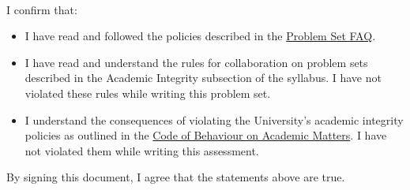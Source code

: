 {{\begin{minipage}{\textwidth}
{	\vspace{0.1in}
	
}
\end{minipage}
}

\vspace*{0.1in}

~

I confirm that:

\begin{itemize} 
	\item I have read and followed the policies described in the \href{\urlFAQ}{Problem Set FAQ}. 
	\item I have read and understand the rules for collaboration on problem sets described in the Academic Integrity subsection of the syllabus. I have not violated these rules while writing this problem set. 
	\item I understand the consequences of violating the University's academic integrity policies as outlined in the \href{http://www.governingcouncil.utoronto.ca/policies/behaveac.htm}{Code of Behaviour on Academic Matters}. I have not violated them while writing this assessment.
\end{itemize}
By signing this document, I agree that the statements above are true. 

\vspace{0.2in}
{\large 
	
	\vspace{0.2in}
	
}
\vfill
\pagebreak
}

